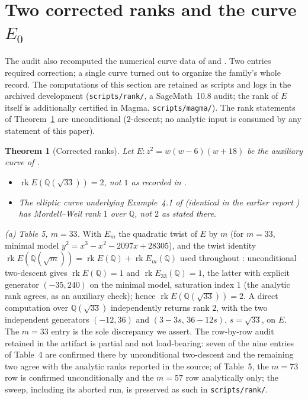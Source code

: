 \documentclass[11pt]{amsart}
\newtheorem{theorem}{Theorem}[section]
\newcommand{\Q}{\mathbb{Q}}
\begin{document}
\section{Two corrected ranks and the curve $E_0$}\label{sec:ranks}

The audit also recomputed the numerical curve data of \cite{BM2000} and
\cite{Stroeker2006}.  Two entries required correction; a single curve
turned out to organize the family's whole record.  The computations of
this section are retained as scripts and logs in the archived
development (\texttt{scripts/rank/}, a SageMath~10.8 audit; the rank of
$E$ itself is additionally certified in Magma,
\texttt{scripts/magma/}).  The rank statements of
Theorem~\ref{thm:ranks} are unconditional ($2$-descent; no analytic
input is consumed by any statement of this paper).

\begin{theorem}[Corrected ranks]\label{thm:ranks}
Let $E\colon z^2=w(w-6)(w+18)$ be the auxiliary curve of \cite{BM2000}.
\begin{itemize}
\item[(a)] $\operatorname{rk} E(\Q(\sqrt{33}))=2$, not $1$ as recorded
in {\cite[Table~5]{BM2000}}.
\item[(b)] The elliptic curve underlying Example~4.1 of
\cite{Stroeker2006} (identical in the earlier report
\cite{Stroeker2002}) has Mordell--Weil rank $1$ over $\Q$, not $2$ as
stated there.
\end{itemize}
\end{theorem}

\emph{(a) Table 5, $m=33$.}  With $E_m$ the quadratic twist of $E$ by
$m$ (for $m=33$, minimal model $y^2=x^3-x^2-2097x+28305$), and the
twist identity
$\operatorname{rk}E(\Q(\sqrt m))=
\operatorname{rk}E(\Q)+\operatorname{rk}E_m(\Q)$ used throughout
{\cite[\S4]{BM2000}}: unconditional two-descent gives
$\operatorname{rk}E(\Q)=1$ and $\operatorname{rk}E_{33}(\Q)=1$, the
latter with explicit generator $(-35,240)$ on the minimal model,
saturation index $1$ (the analytic rank agrees, as an auxiliary check);
hence $\operatorname{rk}E(\Q(\sqrt{33}))=2$.  A direct computation over
$\Q(\sqrt{33})$ independently returns rank $2$, with the two
independent generators $(-12,36)$ and $(3-3s,\,36-12s)$, $s=\sqrt{33}$,
on $E$.  The $m=33$ entry is the sole discrepancy we assert.  The row-by-row
audit retained in the artifact is partial and not load-bearing: seven
of the nine entries of Table~4 are confirmed there by unconditional
two-descent and the remaining two agree with the analytic ranks
reported in the source; of Table~5, the $m=73$ row is confirmed
unconditionally and the $m=57$ row analytically only; the sweep, including
its aborted run, is preserved as such in \texttt{scripts/rank/}.
\end{document}
